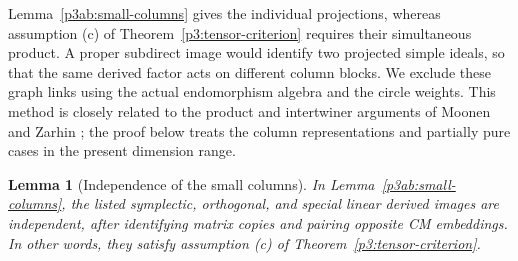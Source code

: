 \documentclass[11pt]{article}
\newtheorem{lemma}[theorem]{Lemma}
\numberwithin{equation}{section}
\begin{document}
Lemma~\ref{p3ab:small-columns} gives the individual projections, whereas
assumption \textnormal{(c)} of Theorem~\ref{p3:tensor-criterion} requires
their simultaneous product.  A proper subdirect image would identify
two projected simple ideals, so that the same derived factor acts
on different column blocks.  We exclude these graph links using
the actual endomorphism algebra and the circle weights.  This
method is closely related to the product and intertwiner arguments
of Moonen and Zarhin
\cite[(3.1) and Lemmas~3.3--3.4]{MoonenZarhin1999}; the proof
below treats the column representations and partially pure cases
in the present dimension range.

\begin{lemma}[Independence of the small columns]
\label{p3ab:independence}
In Lemma~\ref{p3ab:small-columns}, the listed symplectic,
orthogonal, and special linear derived images are independent,
after identifying matrix copies and pairing opposite CM embeddings.
In other words, they satisfy assumption \textnormal{(c)} of
Theorem~\ref{p3:tensor-criterion}.
\end{lemma}
\end{document}
